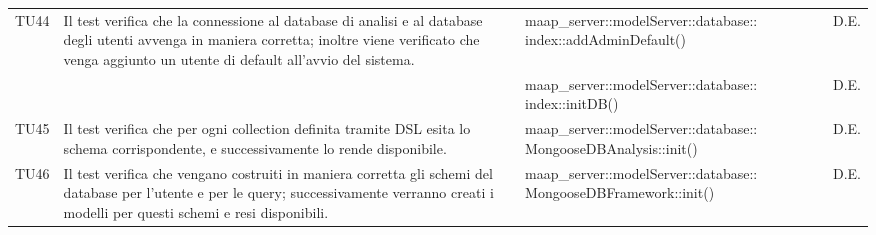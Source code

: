 \begin{center}
\begin{longtable}{|p{1cm}|p{4cm}|p{6cm}|p{2cm}|}
\midrule
TU44
& Il test verifica che la connessione al database di analisi e al database degli utenti avvenga in maniera corretta; inoltre viene verificato che venga aggiunto un utente di default all'avvio del sistema.
& maap\_server::modelServer::database:: index::addAdminDefault()
& D.E.\\
& & maap\_server::modelServer::database:: index::initDB()
& D.E.\\

\midrule
TU45
& Il test verifica che per ogni collection definita tramite DSL esita lo schema corrispondente, e successivamente lo rende disponibile.
& maap\_server::modelServer::database:: MongooseDBAnalysis::init()
& D.E.\\

\midrule
TU46
& Il test verifica che vengano costruiti in maniera corretta gli schemi del database per l'utente e per le query; successivamente verranno creati i modelli per questi schemi e resi disponibili.
& maap\_server::modelServer::database:: MongooseDBFramework::init()
& D.E.\\


\end{longtable}
\end{center}
